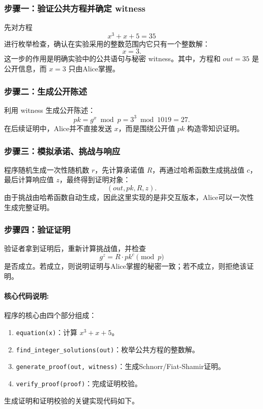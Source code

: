 \documentclass[a4paper]{article}
\begin{document}
\subsubsection{步骤一：验证公共方程并确定 witness}
先对方程
\[
x^3+x+5=35
\]
进行枚举检查，确认在实验采用的整数范围内它只有一个整数解：
\[
x=3.
\]
这一步的作用是明确实验中的公共语句与秘密 witness。其中，方程和 $out=35$ 是公开信息，而 $x=3$ 只由Alice掌握。

\subsubsection{步骤二：生成公开陈述}
利用 witness 生成公开陈述：
\[
pk=g^x \bmod p = 3^3 \bmod 1019 = 27.
\]
在后续证明中，Alice并不直接发送 $x$，而是围绕公开值 $pk$ 构造零知识证明。

\subsubsection{步骤三：模拟承诺、挑战与响应}
程序随机生成一次性随机数 $r$，先计算承诺值 $R$，再通过哈希函数生成挑战值 $c$，最后计算响应值 $z$，最终得到证明对象：
\[
(out, pk, R, z).
\]
由于挑战由哈希函数自动生成，因此这里实现的是非交互版本，Alice可以一次性生成完整证明。

\subsubsection{步骤四：验证证明}
验证者拿到证明后，重新计算挑战值，并检查
\[
g^z = R\cdot pk^c \pmod p
\]
是否成立。若成立，则说明证明与Alice掌握的秘密一致；若不成立，则拒绝该证明。

\paragraph{核心代码说明:}
程序的核心由四个部分组成：

\begin{enumerate}
    \item \texttt{equation(x)}：计算 $x^3+x+5$。
    \item \texttt{find\_integer\_solutions(out)}：枚举公共方程的整数解。
    \item \texttt{generate\_proof(out, witness)}：生成Schnorr/Fiat-Shamir证明。
    \item \texttt{verify\_proof(proof)}：完成证明校验。
\end{enumerate}

生成证明和证明校验的关键实现代码如下。
\end{document}
